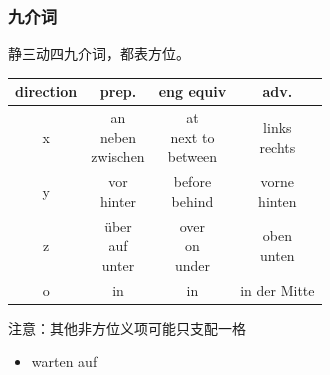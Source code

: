 \subsubsection{九介词}
静三动四九介词，都表方位。
\begin{center}
    \begin{tabular}{|c|c|c|c|}
        \hline
        \rowcolor{gray}
        direction & prep.          & eng equiv & adv.         \\
        \hline
        x         & \makecell{an                              \\ neben \\ zwischen}       & \makecell{at \\ next to \\ between} & \makecell{links \\ rechts}           \\
        \hline
        y         & \makecell{vor                             \\ hinter}  & \makecell{before \\ behind}        & \makecell{vorne \\ hinten}           \\
        \hline
        z         & \makecell{über                            \\ auf \\ unter} & \makecell{over \\ on \\ under} & \makecell{oben \\ unten} \\
        \hline
        o         & in             & in        & in der Mitte \\
        \hline
    \end{tabular}
\end{center}

注意：其他非方位义项可能只支配一格
\begin{itemize}
    \item warten auf \diam[border=true]
\end{itemize}

